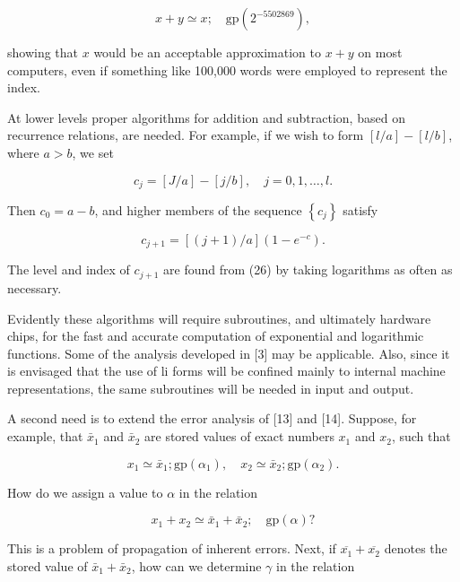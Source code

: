 \documentclass[10pt]{article}
\begin{document}
\begin{equation*}
x+y \simeq x ; \quad \mathrm{gp}\left(2^{-5502869}\right), \tag{24}
\end{equation*}


showing that $x$ would be an acceptable approximation to $x+y$ on most computers, even if something like 100,000 words were employed to represent the index.

At lower levels proper algorithms for addition and subtraction, based on recurrence relations, are needed. For example, if we wish to form $[l / a]-[l / b]$, where $a>b$, we set


\begin{equation*}
c_{j}=[J / a]-[j / b], \quad j=0,1, \ldots, l . \tag{25}
\end{equation*}


Then $c_{0}=a-b$, and higher members of the sequence $\left\{c_{j}\right\}$ satisfy


\begin{equation*}
c_{j+1}=[(j+1) / a]\left(1-e^{-c}\right) . \tag{26}
\end{equation*}


The level and index of $c_{j+1}$ are found from (26) by taking logarithms as often as necessary.

Evidently these algorithms will require subroutines, and ultimately hardware chips, for the fast and accurate computation of exponential and logarithmic functions. Some of the analysis developed in [3] may be applicable. Also, since it is envisaged that the use of li forms will be confined mainly to internal machine representations, the same subroutines will be needed in input and output.

A second need is to extend the error analysis of [13] and [14]. Suppose, for example, that $\bar{x}_{1}$ and $\bar{x}_{2}$ are stored values of exact numbers $x_{1}$ and $x_{2}$, such that

$$
x_{1} \simeq \bar{x}_{1} ; \mathrm{gp}\left(\alpha_{1}\right), \quad x_{2} \simeq \bar{x}_{2} ; \mathrm{gp}\left(\alpha_{2}\right) .
$$

How do we assign a value to $\alpha$ in the relation

$$
x_{1}+x_{2} \simeq \bar{x}_{1}+\bar{x}_{2} ; \quad \mathrm{gp}(\alpha) ?
$$

This is a problem of propagation of inherent errors. Next, if $\overline{x_{1}}+\overline{x_{2}}$ denotes the stored value of $\bar{x}_{1}+\bar{x}_{2}$, how can we determine $\gamma$ in the relation
\end{document}
